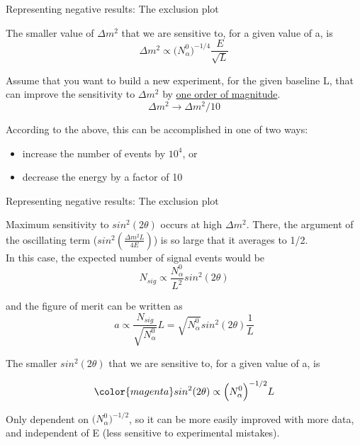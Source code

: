 %
%
%

\begin{frame}{Representing negative results: The exclusion plot}

The smaller value of $\Delta m^{2}$ that we are sensitive to,
for a given value of a, is
\begin{equation*}
  \Delta m^{2} \propto \Big(N^{0}_{\alpha}\Big)^{-1/4} \frac{E}{\sqrt{L}}
\end{equation*}

Assume that you want to build a new experiment, for the given baseline L,
that can improve the sensitivity to $\Delta m^{2}$ by \underline{one order of magnitude}.
\begin{equation*}
  \Delta m^{2} \rightarrow \Delta m^{2} / 10
\end{equation*}

According to the above, this can be accomplished in one of two ways:
\begin{itemize}
 \item increase the number of events by $10^4$, or
 \item decrease the energy by a factor of 10
\end{itemize}

\end{frame}

%
%
%

\begin{frame}{Representing negative results: The exclusion plot}

Maximum sensitivity to $sin^{2} (2\theta)$ occurs at high $\Delta m^{2}$.
There, the argument of the oscillating term ($sin^2(\frac{\Delta m^{2}L}{4E})$)
is so large that it averages to 1/2.\\

In this case, the expected number of signal events would be
\begin{equation*}
     N_{sig} \propto \frac{N^{0}_{\alpha}}{L^2} sin^{2} (2\theta)
\end{equation*}

and the figure of merit can be written as
\begin{equation*}
     a \propto \frac{N_{sig}}{\sqrt{N^{0}_{\alpha}}} L =
              \sqrt{N^{0}_{\alpha}} sin^{2} (2\theta) \frac{1}{L}
\end{equation*}

The smaller $sin^{2} (2\theta)$ that we are sensitive to,
for a given value of a, is

\begin{equation*}
{\color{magenta}
    sin^{2} (2\theta) \propto \Big( N^{0}_{\alpha} \Big)^{-1/2} L
}
\end{equation*}

Only dependent on $\Big( N^{0}_{\alpha} \Big)^{-1/2}$, so it can be more easily
improved with more data, and independent of E (less sensitive to experimental mistakes).

\end{frame}

